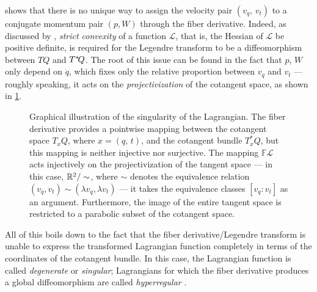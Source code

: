  shows that there is no unique way to assign the velocity pair $(v_q,\,v_t)$ to a conjugate momentum pair $(p, W)$ through the fiber derivative. Indeed, as discussed by \citet[p. 122]{Cannas2001}, \emph{strict convexity} of a function $\mathscr{L}$, that is, the Hessian of $\mathscr{L}$ be positive definite, is required for the Legendre transform to be a diffeomorphism between $TQ$ and $T^*\!Q$. The root of this issue can be found in the fact that $p$, $W$ only depend on $\dot{q}$, which fixes only the relative proportion between $v_q$ and $v_t$ --- roughly speaking, it acts on the \emph{projectivization} of the cotangent space, as shown in \cref{fig:fiber_derivative}.
\begin{figure}[h]
    \centering
    
    \label{fig:fiber_derivative}
    \caption{Graphical illustration of the singularity of the Lagrangian. The fiber derivative provides a pointwise mapping between the cotangent space $T_xQ$, where $x = (q,\,t)$, and the cotangent bundle $T^*_x\!Q$, but this mapping is neither injective nor surjective. The mapping $\mathbb{F}\mathscr{L}$ acts injectively on the projectivization of the tangent space --- in this case, $\mathbb{R}^2 / \sim$, where $\sim$ denotes the equivalence relation $(v_q, v_t) \sim (\lambda v_q, \lambda v_t) $ ---  it takes the equivalence classes $[v_q : v_t]$ as an argument. Furthermore, the image of the entire tangent space is restricted to a parabolic subset of the cotangent space.}
\end{figure}

All of this boils down to the fact that the fiber derivative/Legendre transform is unable to express the transformed Lagrangian function completely in terms of the coordinates of the cotangent bundle. In this case, the Lagrangian function is called \emph{degenerate} or \emph{singular}; Lagrangians for which the fiber derivative produces a global diffeomorphism are called \emph{hyperregular} \cite[p. 236]{Abraham1978}.

